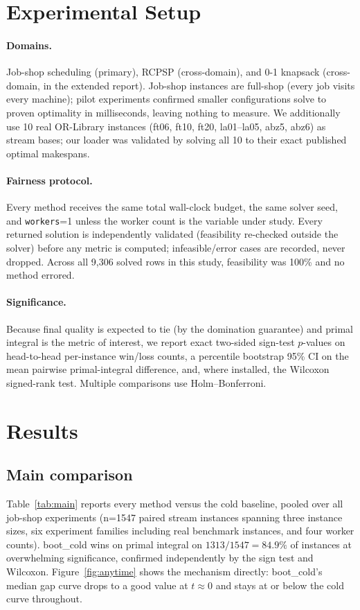\documentclass[11pt]{article}                        %
\begin{document}
\section{Experimental Setup}
\label{sec:setup}

\paragraph{Domains.} Job-shop scheduling (primary), RCPSP (cross-domain), and
0-1 knapsack (cross-domain, in the extended report). Job-shop instances are
full-shop (every job visits every machine); pilot experiments confirmed
smaller configurations solve to proven optimality in milliseconds, leaving
nothing to measure. We additionally use 10 real OR-Library instances (ft06,
ft10, ft20, la01--la05, abz5, abz6) as stream bases; our loader was validated
by solving all 10 to their exact published optimal makespans.

\paragraph{Fairness protocol.} Every method receives the same total wall-clock
budget, the same solver seed, and \texttt{workers}=1 unless the worker count is
the variable under study. Every returned solution is independently validated
(feasibility re-checked outside the solver) before any metric is computed;
infeasible/error cases are recorded, never dropped. Across all 9{,}306 solved
rows in this study, feasibility was 100\% and no method errored.

\paragraph{Significance.} Because final quality is expected to tie (by the
domination guarantee) and primal integral is the metric of interest, we report
exact two-sided sign-test $p$-values on head-to-head per-instance win/loss
counts, a percentile bootstrap 95\% CI on the mean pairwise primal-integral
difference, and, where installed, the Wilcoxon signed-rank test. Multiple
comparisons use Holm--Bonferroni.

\section{Results}
\label{sec:results}

\subsection{Main comparison}
Table~\ref{tab:main} reports every method versus the cold baseline, pooled over
all job-shop experiments (n{=}1547 paired stream instances spanning three
instance sizes, six experiment families including real benchmark instances,
and four worker counts). boot\_cold wins on primal integral on
$1313/1547 = 84.9\%$ of instances at overwhelming significance, confirmed
independently by the sign test and Wilcoxon. Figure~\ref{fig:anytime} shows the
mechanism directly: boot\_cold's median gap curve drops to a good value at
$t{\approx}0$ and stays at or below the cold curve throughout.
\end{document}
